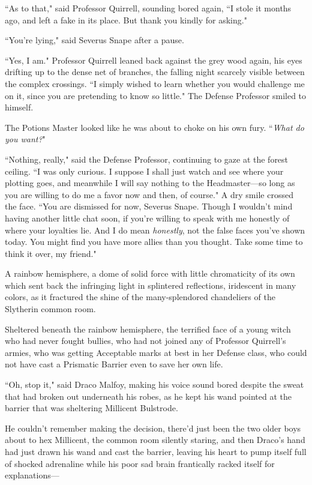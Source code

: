 ``As to that," said Professor Quirrell, sounding bored again, ``I stole it months ago, and left a fake in its place. But thank you kindly for asking."

``You're lying," said Severus Snape after a pause.

``Yes, I am." Professor Quirrell leaned back against the grey wood again, his eyes drifting up to the dense net of branches, the falling night scarcely visible between the complex crossings. ``I simply wished to learn whether you would challenge me on it, since you are pretending to know so little." The Defense Professor smiled to himself.

The Potions Master looked like he was about to choke on his own fury. ``\emph{What do you want?}"

``Nothing, really," said the Defense Professor, continuing to gaze at the forest ceiling. ``I was only curious. I suppose I shall just watch and see where your plotting goes, and meanwhile I will say nothing to the Headmaster—so long as you are willing to do me a favor now and then, of course." A dry smile crossed the face. ``You are dismissed for now, Severus Snape. Though I wouldn't mind having another little chat soon, if you're willing to speak with me honestly of where your loyalties lie. And I do mean \emph{honestly}, not the false faces you've shown today. You might find you have more allies than you thought. Take some time to think it over, my friend."


A rainbow hemisphere, a dome of solid force with little chromaticity of its own which sent back the infringing light in splintered reflections, iridescent in many colors, as it fractured the shine of the many-splendored chandeliers of the Slytherin common room.

Sheltered beneath the rainbow hemisphere, the terrified face of a young witch who had never fought bullies, who had not joined any of Professor Quirrell's armies, who was getting Acceptable marks at best in her Defense class, who could not have cast a Prismatic Barrier even to save her own life.

``Oh, stop it," said Draco Malfoy, making his voice sound bored despite the sweat that had broken out underneath his robes, as he kept his wand pointed at the barrier that was sheltering Millicent Bulstrode.

He couldn't remember making the decision, there'd just been the two older boys about to hex Millicent, the common room silently staring, and then Draco's hand had just drawn his wand and cast the barrier, leaving his heart to pump itself full of shocked adrenaline while his poor sad brain frantically racked itself for explanations—

